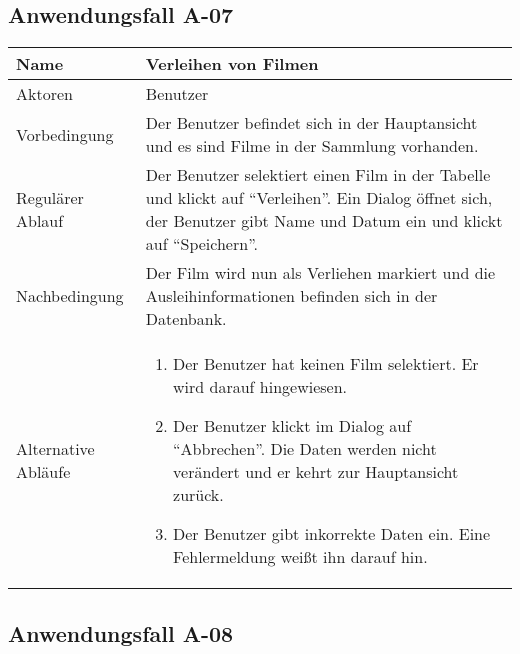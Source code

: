 \documentclass[oneside,german,oneside]{scrbook}
\begin{document}
    \subsection{Anwendungsfall A-07}\label{uc:07}

      \begin{tabular}{|b|p{10cm}|}
        \hline
        Name & Verleihen von Filmen \\
        \hline
        Aktoren & Benutzer \\
        \hline
        \hline
        Vorbedingung & Der Benutzer befindet sich in der Hauptansicht und es
        sind Filme in der Sammlung vorhanden.\\
        \hline
        Regul\"arer Ablauf & Der Benutzer selektiert einen Film in der Tabelle
        und klickt auf ``Verleihen''. Ein Dialog \"offnet sich, der Benutzer gibt
        Name und Datum ein und klickt auf ``Speichern''.\\
        \hline
        Nachbedingung & Der Film wird nun als Verliehen markiert und die
        Ausleihinformationen befinden sich in der Datenbank.\\
        \hline
        Alternative Abl\"aufe &
        \begin{enumerate}
          \item Der Benutzer hat keinen Film selektiert. Er wird darauf hingewiesen.
          \item Der Benutzer klickt im Dialog auf ``Abbrechen''. Die Daten
          werden nicht ver\"andert und er kehrt zur Hauptansicht zur\"uck.
          \item Der Benutzer gibt inkorrekte Daten ein. Eine Fehlermeldung
          wei{\ss}t ihn darauf hin.
        \end{enumerate}\\
        \hline
      \end{tabular}

    \subsection{Anwendungsfall A-08}\label{uc:08}
\end{document}
